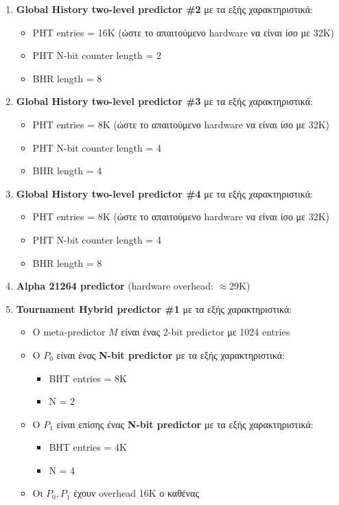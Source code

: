 \documentclass[12pt,a4paper]{article}
\begin{document}
\begin{enumerate}
				\item \textbf{Global History two-level predictor \#2} με τα εξής χαρακτηριστικά:
				\begin{itemize}
					\item PHT entries = 16K (ώστε το απαιτούμενο hardware να είναι ίσο με 32K)
					\item PHT N-bit counter length = 2
					\item BHR length = 8
				\end{itemize}
			
				\item \textbf{Global History two-level predictor \#3} με τα εξής χαρακτηριστικά:
				\begin{itemize}
					\item PHT entries = 8K (ώστε το απαιτούμενο hardware να είναι ίσο με 32K)
					\item PHT N-bit counter length = 4
					\item BHR length = 4
				\end{itemize}
			
				\item \textbf{Global History two-level predictor \#4} με τα εξής χαρακτηριστικά:
				\begin{itemize}
					\item PHT entries = 8K (ώστε το απαιτούμενο hardware να είναι ίσο με 32K)
					\item PHT N-bit counter length = 4
					\item BHR length = 8
				\end{itemize}
				
				\item \textbf{Alpha 21264 predictor} (hardware overhead: $\approx$29K)
				
				\item \textbf{Tournament Hybrid predictor \#1} με τα εξής χαρακτηριστικά:
					\begin{itemize}
						\item Ο meta-predictor $M$ είναι ένας 2-bit predictor με 1024 entries
						\item Ο $P_0$ είναι ένας \textbf{N-bit predictor} με τα εξής χαρακτηριστικά:
							\begin{itemize}
								\item BHT entries = 8K
								\item N = 2
							\end{itemize}
						\item Ο $P_1$ είναι επίσης ένας \textbf{N-bit predictor} με τα εξής χαρακτηριστικά:
							\begin{itemize}
								\item BHT entries =  4K
								\item N = 4
							\end{itemize}
						\item Οι $P_0, P_1$ έχουν overhead 16K ο καθένας
					\end{itemize}
				

\end{enumerate}
\end{document}
